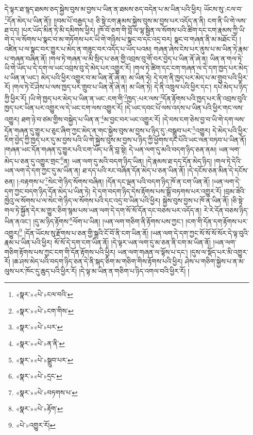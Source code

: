 དེ་ལྟར་ཐ་སྙད་ཐམས་ཅད་སྐྱེས་བུས་མ་བྱས་པ་ཡིན་ན་ཐམས་ཅད་བདེན་པ་མ་ཡིན་པའི་ཕྱིར། ཡོངས་སུ་:ངལ་བ་\footnote{«སྣར་»«པེ་»ངལ་བའི་}དོན་མེད་པ་ཡིན་ནོ།། །།བམ་པོ་བརྒྱད་པ། ཅི་སྟེ་ངག་རྣམས་སྐྱེས་བུས་མ་བྱས་པར་འདོད་ན་ནི། ངག་ནི་ཡི་གེ་ལས་ཐ་དད། །པར་ཡོད་མིན་ཏེ་མི་དམིགས་ཕྱིར། །ཁོ་བོ་ཅག་གི་བློ་ལ་ལྷ་སྦྱིན་ལ་སོགས་པའི་ཚིག་དང་ངག་རྣམས་ཀྱི་ཡི་གེ་ད་ལ་སོགས་པ་སྣང་བ་མ་གཏོགས་པར་ཡི་གེ་གཉིས་པ་སྣང་བ་དང་འདྲ་བར། སྣང་བ་གཞན་ནི་མ་མཐོང་ངོ། །འཛིན་པ་ལ་སྣང་བར་གྱུར་པ་མེད་ན་གཟུང་བར་འདོད་པ་ཡོད་པའམ། གཞན་ཞེས་ངེས་པར་ནུས་པ་མ་ཡིན་ཏེ་རྣམ་པ་གཞན་བཞིན་ནོ། །གལ་ཏེ་གཞན་ལ་མི་སྲིད་པ་ཅན་གྱི་འབྲས་བུ་གོ་བར་བྱེད་པ་ཡིན་ནོ་ཞེ་ན། ཡིན་ན་གལ་ཏེ་ཡི་གེ་ཡོད་པ་དེ་དག་ལ་ཡང་འབྲས་བུ་དེ་མེད་པར་འགྱུར་རོ། །གལ་ཏེ་ཚིག་དང་ངག་གཞན་ལ་དེ་དག་ཁྱད་པར་མེད་པ་ཡིན་ན་ཡང་། མེད་པའི་ཕྱིར་འགྱུར་བ་མ་ཡིན་ནོ་ཞེ་ན། མ་ཡིན་ཏེ། དེ་དག་ནི་ཁྱད་པར་མེད་པ་མ་གྲུབ་པའི་ཕྱིར་རོ། །གལ་ཏེ་ངོ་ཤེས་པ་ལས་ཁྱད་པར་གྲུབ་པ་ཡིན་ནོ་ཞེ་ན། མ་ཡིན་ཏེ། དེ་ནི་འཁྲུལ་པའི་ཕྱིར་དང་། དཔེ་མེད་པ་ཉིད་ཀྱི་ཕྱིར་རོ། །ཡི་གེ་ཁྱད་པར་མེད་པ་ཡིན་ན་ཡང་:ངག་གི་\footnote{«སྣར་»«པེ་»ངག་གིས་}ཁྱད་:པར་ལས་\footnote{«སྣར་»«པེ་»པར་}དོན་རྟོགས་པའི་ཁྱད་པར་ནི་འབྲས་བུའི་ཁྱད་པར་ཡིན་པར་འགྱུར་ལ་དེ་ཡང་ངག་ལས་འགྱུར་རོ། །དེ་ཡང་དབང་པོ་ལས་འདས་པ་ཡིན་པའི་ཕྱིར་གང་ལས་འགྱུར། ཐག་ཉེ་བ་ཙམ་གྱིས་བསྐྱེད་པ་ཡིན་ན་\footnote{«སྣར་»«པེ་»ན་ནི་}མ་བྱང་བར་ཡང་འགྱུར་རོ། །དེ་བས་ངག་ཅེས་བྱ་བ་ཡི་གེ་དག་ལས་དོན་གཞན་དུ་གྱུར་པ་ཅུང་ཞིག་ཀྱང་མེད་ན་གང་སྐྱེས་བུས་མ་བྱས་པ་ཉིད་དུ་:བསྒྲུབ་པར་\footnote{«སྣར་»«པེ་»སྒྲུབ་པར་}འགྱུར། དེ་མེད་པའི་ཕྱིར་རིག་བྱེད་ཀྱི་ཁྱད་པར་དུ་མ་བྱས་པའི་ཡི་གེ་སྐྱེས་བུས་མ་བྱས་པ་ཉིད་ཀྱི་ཕྱོགས་དང་པོའི་ཡང་ལན་བཏབ་པ་ཡིན་ནོ། །གཞན་ཡང་དོན་གཞན་དུ་གྱུར་པའི་ངག་ཡོད་པ་ནི་བླ་སྟེ། དེ་ཡན་ལག་དུ་མའི་བདག་ཉིད་ཅན་ནམ། ཡན་ལག་མེད་པ་ཅན་དུ་འགྱུར་གྲང་\footnote{«སྣར་»«པེ་»དྲང་}ན། ཡན་ལག་དུ་མའི་བདག་ཉིད་ཡིན། །དེ་རྣམས་ཐ་དད་དོན་མེད་ཉིད། །གལ་ཏེ་དེའི་ཡན་ལག་དེ་དག་ཀྱང་དུ་མ་ཡིན་ན། ཐ་དད་པའི་རང་བཞིན་དོན་མེད་པ་ཅན་ཡིན་ནོ། །དེ་དངོས་ཅན་མིན་དེ་དངོས་ཅན། །:བརྟགས་པ་\footnote{«སྣར་»«པེ་»བཏགས་པ་}སེང་གེ་ཉིད་སོགས་བཞིན། །དོན་དང་ལྡན་པའི་བདག་ཉིད་ཁོ་ན་ངག་ཡིན་ནོ། །ཡན་ལག་དེ་དག་ཀྱང་བདག་ཉིད་དོན་མེད་པ་ཡིན་ཏེ། དེ་དག་བདག་ཉིད་དེས་རྟོགས་པས་སྒྲོ་བཏགས་པར་འགྱུར་རོ། །བྲམ་ཟེའི་ཁྱེའུ་ལ་སོགས་པ་ལ་སེང་གེ་ཉིད་ལ་སོགས་པའི་དང་འདྲ་བ་ཡིན་པའི་ཕྱིར། སྐྱེས་བུས་བྱས་པ་ཁོ་ན་ཡིན་ནོ། །ཅི་སྟེ་གལ་ཏེ་སྐྱོན་དེར་མ་གྱུར་ཅིག་སྙམ་པས་ཡན་ལག་དེ་དག་སོ་སོ་དོན་དང་བཅས་པར་འདོད་ན། རེ་རེ་དོན་བཅས་ཉིད་ཡིན་ནའང་། །དུ་མ་ཉིད་རྟོགས་\footnote{«སྣར་»«པེ་»རྟོག་}ལོག་པ་ཡིན། །ཡན་ལག་གཅིག་ནི་རྟོགས་པས་ཀྱང་། །ངག་གི་དོན་དག་རྟོགས་པར་འགྱུར།\footnote{«པེ་»འགྱུར་རོ།} །དོན་ཡོངས་སུ་རྫོགས་པ་ཅན་གྱི་སྒྲའི་ངོ་བོ་ནི་ངག་ཡིན་ནོ། །ཡན་ལག་དེ་དག་ཀྱང་སོ་སོ་སོ་སོར་དེ་ལྟ་བུའི་རྣམ་པ་ཡིན་པའི་ཕྱིར། སོ་སོ་དེ་དག་ངག་ཡིན་ནོ། །དེ་ལྟར་ཡན་ལག་དུ་མ་ཅན་ནི་ངག་མ་ཡིན་ནོ། །ཡན་ལག་གཅིག་རྟོགས་པས་ཀྱང་ངག་གི་དོན་རྟོགས་པའི་ཕྱིར། ཡན་ལག་གཞན་ལ་ལྟོས་པ་དང་། །དུས་ལ་སྡོད་པར་མི་འགྱུར་རོ། །ཆ་ཤས་མེད་པའི་བདག་ཉིད་ཅན་དེ་ནི་སྐད་ཅིག་མ་གཅིག་གིས་རྟོགས་པའི་ཕྱིར། ཤེས་པ་གཅིག་སྐྱེས་པ་ན་མ་ལུས་པར་ཁོང་དུ་ཆུད་པའི་ཕྱིར་རོ། །དེ་ལྟ་མ་ཡིན་ན་གཅིག་པ་ཉིད་འགལ་བའི་ཕྱིར་རོ། །
